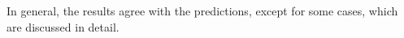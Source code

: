 In general, the results agree with the predictions, except for some cases, which are discussed
in detail.
% 

\clearpage